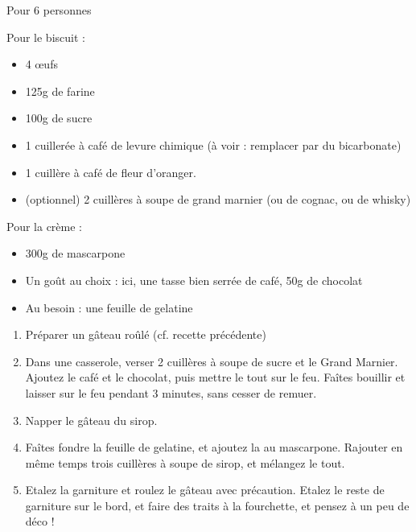 \bigskip
{}
{Pour 6 personnes}{Pour le biscuit :
\begin{itemize}
	\item 4 \oe ufs
	\item 125g de farine
	\item 100g de sucre
	\item 1 cuillerée à café de levure chimique (à voir : remplacer par du bicarbonate)
	\item 1 cuillère à café de fleur d'oranger.
	\item (optionnel) 2 cuillères à soupe de grand marnier (ou de cognac, ou de whisky)
\end{itemize}
Pour la crème :	
\begin{itemize}
	\item 300g de mascarpone
	\item Un goût au choix : ici, une tasse bien serrée de café, 50g de chocolat
	\item Au besoin : une feuille de gelatine
\end{itemize}}
{\phantom{.}

\bigskip
\phantom{.}
\begin{enumerate}
	\item Préparer un gâteau roûlé (cf. recette précédente)
	\item Dans une casserole, verser 2 cuillères à soupe de sucre et le Grand Marnier. Ajoutez le café et le chocolat, puis mettre le tout sur le feu. Faîtes bouillir et laisser sur le feu pendant 3 minutes, sans cesser de remuer.
	\item Napper le gâteau du sirop.
	\item Faîtes fondre la feuille de gelatine, et ajoutez la au mascarpone. Rajouter en même temps trois cuillères à soupe de sirop, et mélangez le tout.
	\item Etalez la garniture et roulez le gâteau avec précaution. Etalez le reste de garniture sur le bord, et faire des traits à la fourchette, et pensez à un peu de déco !
\end{enumerate}

\bigskip
\phantom{.}}

